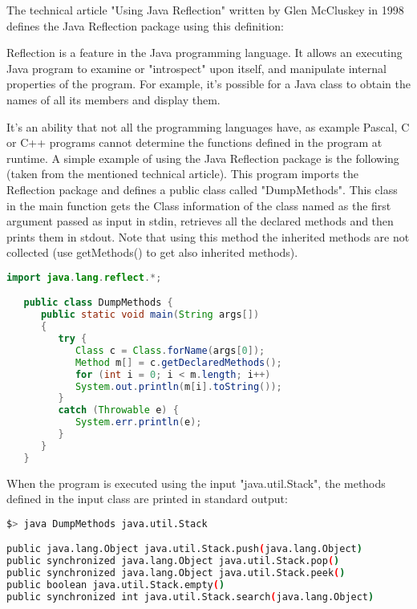 \documentclass[a4paper,10pt]{memoir}
\begin{document}
The technical article "Using Java Reflection" written by Glen McCluskey in 1998 defines the Java Reflection package using this definition\cite{javareflection}:
\begin{quoting}[font=itshape, begintext={"}, endtext={"}]
Reflection is a feature in the Java programming language. It allows an executing Java program to examine or "introspect" upon itself, and manipulate internal properties of the program. For example, it's possible for a Java class to obtain the names of all its members and display them.
\end{quoting}
It's an ability that not all the programming languages have, as example Pascal, C or C++ programs cannot determine the functions defined in the program at runtime.
A simple example of using the Java Reflection package is the following (taken from the mentioned technical article). This program imports the Reflection package and defines a public class called "DumpMethods". This class in the main function gets the Class information of the class named as the first argument passed as input in stdin, retrieves all the declared methods and then prints them in stdout. Note that using this method the inherited methods are not collected (use getMethods() to get also inherited methods).
\begin{lstlisting}[language=Java]
import java.lang.reflect.*;

   public class DumpMethods {
      public static void main(String args[])
      {
         try {
            Class c = Class.forName(args[0]);
            Method m[] = c.getDeclaredMethods();
            for (int i = 0; i < m.length; i++)
            System.out.println(m[i].toString());
         }
         catch (Throwable e) {
            System.err.println(e);
         }
      }
   }
\end{lstlisting}
When the program is executed using the input "java.util.Stack", the methods defined in the input class are printed in standard output:
\begin{lstlisting}[language=Bash]
$> java DumpMethods java.util.Stack

public java.lang.Object java.util.Stack.push(java.lang.Object)
public synchronized java.lang.Object java.util.Stack.pop()
public synchronized java.lang.Object java.util.Stack.peek()
public boolean java.util.Stack.empty()
public synchronized int java.util.Stack.search(java.lang.Object)
\end{lstlisting}
\end{document}
